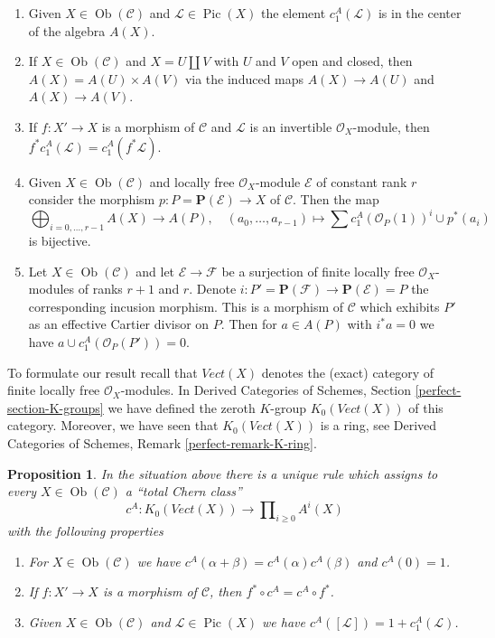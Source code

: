 \documentclass{stacks-project}
\theoremstyle{plain}
\newtheorem{proposition}[subsection]{Proposition}
\theoremstyle{definition}
\theoremstyle{remark}
\numberwithin{equation}{subsection}
\def\Ob{\mathop{\mathrm{Ob}}\nolimits}
\def\Pic{\mathop{\mathrm{Pic}}\nolimits}
\begin{document}
\begin{enumerate}
\item Given $X \in \Ob(\mathcal{C})$ and $\mathcal{L} \in \Pic(X)$
the element $c_1^A(\mathcal{L})$ is in the center of the algebra $A(X)$.
\item If $X \in \Ob(\mathcal{C})$ and $X = U \amalg V$ with $U$ and $V$
open and closed, then $A(X) = A(U) \times A(V)$ via the induced maps
$A(X) \to A(U)$ and $A(X) \to A(V)$.
\item If $f : X' \to X$ is a morphism of $\mathcal{C}$ and $\mathcal{L}$
is an invertible $\mathcal{O}_X$-module, then $f^*c_1^A(\mathcal{L}) =
c_1^A(f^*\mathcal{L})$.
\item Given $X \in \Ob(\mathcal{C})$ and locally free $\mathcal{O}_X$-module
$\mathcal{E}$ of constant rank $r$ consider the morphism
$p : P = \mathbf{P}(\mathcal{E}) \to X$ of $\mathcal{C}$.
Then the map
$$
\bigoplus\nolimits_{i = 0, \ldots, r - 1} A(X)
\longrightarrow A(P),\quad
(a_0, \ldots, a_{r - 1}) \longmapsto
\sum c_1^A(\mathcal{O}_P(1))^i \cup p^*(a_i)
$$
is bijective.
\item Let $X \in \Ob(\mathcal{C})$ and let $\mathcal{E} \to \mathcal{F}$
be a surjection of finite locally free $\mathcal{O}_X$-modules
of ranks $r + 1$ and $r$. Denote
$i : P' = \mathbf{P}(\mathcal{F}) \to \mathbf{P}(\mathcal{E}) = P$ the
corresponding incusion morphism. This is a morphism of $\mathcal{C}$
which exhibits $P'$ as an effective Cartier divisor on $P$. Then for
$a \in A(P)$ with $i^*a = 0$ we have
$a \cup c_1^A(\mathcal{O}_P(P')) = 0$.
\end{enumerate}
To formulate our result recall that $\textit{Vect}(X)$ denotes the
(exact) category of finite locally free $\mathcal{O}_X$-modules.
In Derived Categories of Schemes, Section \ref{perfect-section-K-groups}
we have defined the zeroth $K$-group
$K_0(\textit{Vect}(X))$ of this category.
Moreover, we have seen that $K_0(\textit{Vect}(X))$ is a ring, see
Derived Categories of Schemes, Remark \ref{perfect-remark-K-ring}.

\begin{proposition}
\label{proposition-chern-class}
In the situation above there is a unique rule which assigns to
every $X \in \Ob(\mathcal{C})$ a ``total Chern class''
$$
c^A : K_0(\textit{Vect}(X)) \longrightarrow  \prod\nolimits_{i \geq 0} A^i(X)
$$
with the following properties
\begin{enumerate}
\item For $X \in \Ob(\mathcal{C})$ we have
$c^A(\alpha + \beta) = c^A(\alpha) c^A(\beta)$
and $c^A(0) = 1$.
\item If $f : X' \to X$ is a morphism of $\mathcal{C}$, then
$f^* \circ c^A =  c^A \circ f^*$.
\item Given $X \in \Ob(\mathcal{C})$ and $\mathcal{L} \in \Pic(X)$
we have $c^A([\mathcal{L}]) = 1 + c_1^A(\mathcal{L})$.
\end{enumerate}
\end{proposition}
\end{document}
